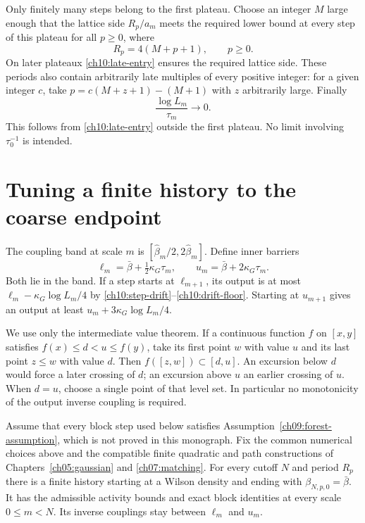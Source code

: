 Only finitely many steps belong to the first plateau. Choose an integer
$M$ large enough that the lattice side $R_p/a_m$ meets the required
lower bound at every step of this plateau for all $p\ge0$, where
\begin{equation}\label{ch10:periods}
                 R_p=4(M+p+1),\qquad p\ge0.
\end{equation}
On later plateaux \eqref{ch10:late-entry} ensures the required lattice side. These periods also contain
arbitrarily late multiples of every positive integer: for a given
integer $c$, take $p=c(M+z+1)-(M+1)$ with $z$ arbitrarily large.
Finally
\[
 \frac{\log L_m}{\tau_m}\longrightarrow0.
\]
This follows from \eqref{ch10:late-entry} outside the first plateau.
No limit involving $\tau_0^{-1}$ is intended.

\section{Tuning a finite history to the coarse endpoint}
\label{ch10:shooting}

The coupling band at scale $m$ is
$[\widehat\beta_m/2,2\widehat\beta_m]$. Define inner barriers
\[
 \ell_m=\bar\beta+\tfrac12\kappa_G\tau_m,
 \qquad u_m=\bar\beta+2\kappa_G\tau_m.
\]
Both lie in the band. If a step starts at $\ell_{m+1}$, its output
is at most $\ell_m-\kappa_G\log L_m/4$ by
\eqref{ch10:step-drift}--\eqref{ch10:drift-floor}. Starting at
$u_{m+1}$ gives an output at least
$u_m+3\kappa_G\log L_m/4$.

We use only the intermediate value theorem. If a continuous function
$f$ on $[x,y]$ satisfies $f(x)\le d<u\le f(y)$, take its first
point $w$ with value $u$ and its last point $z\le w$ with value $d$.
Then $f([z,w])\subset[d,u]$. An excursion below $d$ would force a
later crossing of $d$; an excursion above $u$ an earlier crossing of
$u$. When $d=u$, choose a single point of that level set. In
particular no monotonicity of the output inverse coupling is required.

\begin{theorem}\label{ch10:finite-history}
Assume that every block step used below satisfies Assumption~\ref{ch09:forest-assumption}, which is not proved in this monograph. Fix the common numerical choices above and the compatible finite
quadratic and path constructions of Chapters~\ref{ch05:gaussian}
and \ref{ch07:matching}. For every cutoff $N$ and period $R_p$ there
is a finite history starting at a Wilson density and ending with
$\beta_{N,p,0}=\bar\beta$. It has the admissible activity bounds and
exact block identities at every scale $0\le m<N$. Its inverse couplings
stay between $\ell_m$ and $u_m$.
\end{theorem}

